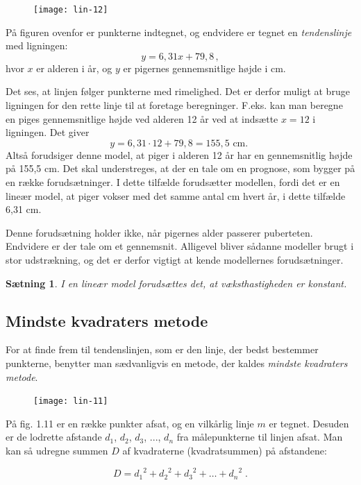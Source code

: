 \documentclass[12pt,oneside,a4paper]{article}
\newtheorem{thm}{Sætning}[section]
\begin{document}
\begin{figure}[H]
    \centering
    \texttt{[image: lin-12]}
\end{figure}

På figuren ovenfor er punkterne indtegnet, og endvidere er tegnet en {\em tendenslinje} med ligningen:
\[
    y = 6,31 x + 79,8 \,,
\]
hvor $x$ er alderen i år, og $y$ er pigernes gennemsnitlige højde i cm.

Det ses, at linjen følger punkterne med rimelighed. Det er derfor muligt at bruge ligningen
for den rette linje til at foretage beregninger. F.eks. kan man beregne en piges gennemsnitlige højde ved alderen 12 år ved at indsætte $x=12$ i ligningen. Det giver
\[
    y=6,31\cdot 12 + 79,8 = 155,5 \mbox{ cm. }
\]
Altså forudsiger denne model, at piger i alderen 12 år har en gennemsnitlig
højde på 155,5 cm.  Det skal understreges, at der en tale om en prognose, som
bygger på en række forudsætninger.  I dette tilfælde forudsætter modellen,
fordi det er en lineær model, at piger vokser med det samme antal cm hvert år,
i dette tilfælde 6,31 cm.

Denne forudsætning holder ikke, når pigernes alder passerer puberteten.
Endvidere er der tale om et gennemsnit.  Alligevel bliver sådanne modeller brugt
i stor udstrækning, og det er derfor vigtigt at kende modellernes
forudsætninger. 
\begin{thm}
    I en lineær model forudsættes det, at væksthastigheden er konstant.
\end{thm}

\subsection{Mindste kvadraters metode}

For at finde frem til tendenslinjen, som er den linje, der bedst bestemmer
punkterne, benytter man sædvanligvis en metode, der kaldes {\em mindste
kvadraters metode}.

\begin{figure}[H]
    \centering
    \texttt{[image: lin-11]}
\end{figure}

På fig. 1.11 er en række punkter afsat, og en vilkårlig linje $m$ er tegnet. Desuden er de
lodrette afstande $d_1$, $d_2$, $d_3$, ..., $d_n$ fra målepunkterne til linjen afsat. Man
kan så udregne summen $D$ af kvadraterne (kvadratsummen) på afstandene:

\[
D = {d_1}^2 + {d_2}^2 + {d_3}^2 + \ldots + {d_n}^2 \; . 
\]
\end{document}
